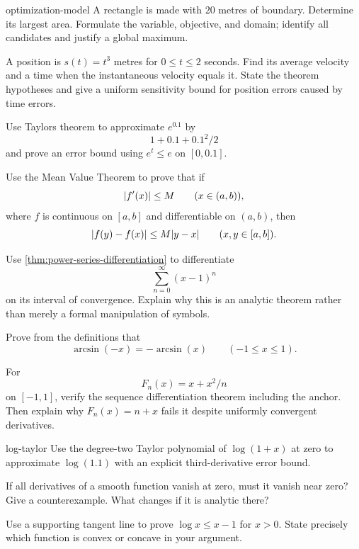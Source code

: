 \begin{hexercise}{optimization-model}
A rectangle is made with $20$ metres of boundary. Determine its largest area. Formulate the variable, objective, and domain; identify all candidates and justify a global maximum.
\end{hexercise}

\begin{exercise}
A position is $s(t)=t^3$ metres for $0\leq t\leq2$ seconds. Find its average velocity and a time when the instantaneous velocity equals it. State the theorem hypotheses and give a uniform sensitivity bound for position errors caused by time errors.
\end{exercise}

\begin{exercise}
Use Taylor\textquotesingle s theorem to approximate $e^{0.1}$ by
\[
1+0.1+0.1^2/2
\]
 and prove an error bound using $e^t\leq e$ on $[0,0.1]$.
\end{exercise}

\begin{exercise}
Use the Mean Value Theorem to prove that if
\[
\lvert f'(x)\rvert\leq M
\qquad(x\in(a,b)),
\]
where $f$ is continuous on $[a,b]$ and differentiable on $(a,b)$, then
\[
\lvert f(y)-f(x)\rvert\leq M\lvert y-x\rvert
\qquad(x,y\in[a,b]).
\]
\end{exercise}

\begin{exercise}
Use \cref{thm:power-series-differentiation} to differentiate
\[
\sum_{n=0}^{\infty}(x-1)^n
\]
on its interval of convergence. Explain why this is an analytic theorem rather than merely a formal manipulation of symbols.
\end{exercise}

\begin{exercise}
Prove from the definitions that
\[
\arcsin(-x)=-\arcsin(x)
\qquad(-1\leq x\leq1).
\]
\end{exercise}

\begin{exercise}
For
\[
F_n(x)=x+x^2/n
\]
 on $[-1,1]$, verify the sequence differentiation
theorem including the anchor. Then explain why $F_n(x)=n+x$ fails it
despite uniformly convergent derivatives.
\end{exercise}
\begin{hexercise}{log-taylor}
Use the degree-two Taylor polynomial of $\log(1+x)$ at zero to
approximate $\log(1.1)$ with an explicit third-derivative error bound.
\end{hexercise}
\begin{exercise}
If all derivatives of a smooth function vanish at zero, must it vanish
near zero? Give a counterexample. What changes if it is analytic there?
\end{exercise}
\begingroup
\let\usualNeedspace\Needspace
\renewcommand{\Needspace}[1]{\usualNeedspace{3\baselineskip}}
\begin{exercise}
Use a supporting tangent line to prove $\log x\leq x-1$ for $x>0$.
State precisely which function is convex or concave in your argument.
\end{exercise}
\endgroup
